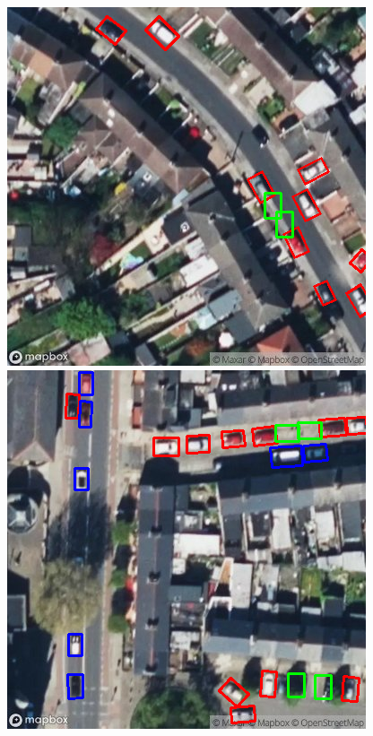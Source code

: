 \begin{figure}[htbp]
  \centering
  \begin{minipage}{0.45\textwidth}
    \centering
    \includegraphics[width=\textwidth]{images/empty_parking1.png}
  \end{minipage}
  \hfill
  \begin{minipage}{0.45\textwidth}
    \centering
    \includegraphics[width=\textwidth]{images/empty_parking2.png}

\end{minipage}
\end{figure}

